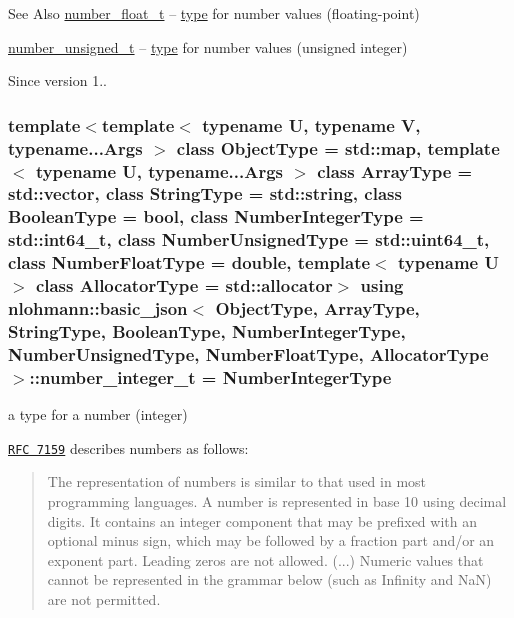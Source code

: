 \begin{DoxySeeAlso}{See Also}
\hyperlink{classnlohmann_1_1basic__json_a74a0013e847fdc574b48f931f0e757e1}{number\-\_\-float\-\_\-t} -- \hyperlink{classnlohmann_1_1basic__json_a5d466b240d0ba9f648d7fd4ff42359f5}{type} for number values (floating-\/point)

\hyperlink{classnlohmann_1_1basic__json_a60a04166c122072ab11eaf9845d9cd1d}{number\-\_\-unsigned\-\_\-t} -- \hyperlink{classnlohmann_1_1basic__json_a5d466b240d0ba9f648d7fd4ff42359f5}{type} for number values (unsigned integer)
\end{DoxySeeAlso}
\begin{DoxySince}{Since}
version 1.. 
\end{DoxySince}
\hypertarget{classnlohmann_1_1basic__json_ac4b10b2364f26ce47bdb9a413ff04a59}{
\subsubsection[{number\-\_\-integer\-\_\-t}]{\setlength{\rightskip}{0pt plus 5cm}template$<$template$<$ typename U, typename V, typename...\-Args $>$ class Object\-Type = std\-::map, template$<$ typename U, typename...\-Args $>$ class Array\-Type = std\-::vector, class String\-Type  = std\-::string, class Boolean\-Type  = bool, class Number\-Integer\-Type  = std\-::int64\-\_\-t, class Number\-Unsigned\-Type  = std\-::uint64\-\_\-t, class Number\-Float\-Type  = double, template$<$ typename U $>$ class Allocator\-Type = std\-::allocator$>$ using {\bf nlohmann\-::basic\-\_\-json}$<$ Object\-Type, Array\-Type, String\-Type, Boolean\-Type, Number\-Integer\-Type, Number\-Unsigned\-Type, Number\-Float\-Type, Allocator\-Type $>$\-::{\bf number\-\_\-integer\-\_\-t} =  Number\-Integer\-Type}}\label{classnlohmann_1_1basic__json_ac4b10b2364f26ce47bdb9a413ff04a59}


a type for a number (integer) 

\href{http://rfc7159.net/rfc7159}{\tt R\-F\-C 7159} describes numbers as follows\-: \begin{quotation}
The representation of numbers is similar to that used in most programming languages. A number is represented in base 10 using decimal digits. It contains an integer component that may be prefixed with an optional minus sign, which may be followed by a fraction part and/or an exponent part. Leading zeros are not allowed. (...) Numeric values that cannot be represented in the grammar below (such as Infinity and Na\-N) are not permitted.

\end{quotation}


